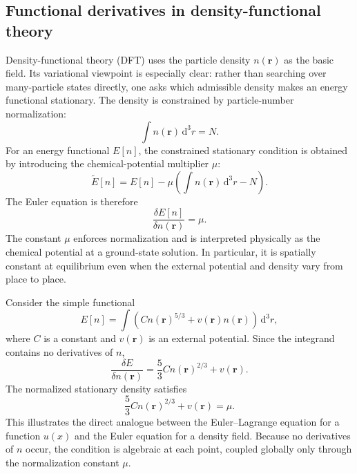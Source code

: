 \subsection{Functional derivatives in density-functional theory}
Density-functional theory (DFT) uses the particle density $n(\mathbf r)$ as the basic field. Its variational viewpoint is especially clear: rather than searching over many-particle states directly, one asks which admissible density makes an energy functional stationary. The density is constrained by particle-number normalization:
\begin{equation}
\int n(\mathbf r)\,\mathrm{d}^3r=N.
\end{equation}
For an energy functional $E[n]$, the constrained stationary condition is obtained by introducing the chemical-potential multiplier $\mu$:
\begin{equation}
\widetilde E[n]=E[n]-\mu\left(\int n(\mathbf r)\,\mathrm{d}^3r-N\right).
\end{equation}
The Euler equation is therefore
\begin{equation}
\frac{\delta E[n]}{\delta n(\mathbf r)}=\mu.
\end{equation}
The constant $\mu$ enforces normalization and is interpreted physically as the chemical potential at a ground-state solution. In particular, it is spatially constant at equilibrium even when the external potential and density vary from place to place.

\begin{example}
Consider the simple functional
\begin{equation}
E[n]=\int\left(Cn(\mathbf r)^{5/3}
+v(\mathbf r)n(\mathbf r)\right)\,\mathrm{d}^3r,
\end{equation}
where $C$ is a constant and $v(\mathbf r)$ is an external potential. Since the integrand contains no derivatives of $n$,
\begin{equation}
\frac{\delta E}{\delta n(\mathbf r)}
=\frac{5}{3}C n(\mathbf r)^{2/3}+v(\mathbf r).
\end{equation}
The normalized stationary density satisfies
\begin{equation}
\frac{5}{3}C n(\mathbf r)^{2/3}+v(\mathbf r)=\mu.
\end{equation}
This illustrates the direct analogue between the Euler--Lagrange equation for a function $u(x)$ and the Euler equation for a density field. Because no derivatives of $n$ occur, the condition is algebraic at each point, coupled globally only through the normalization constant $\mu$.
\end{example}

